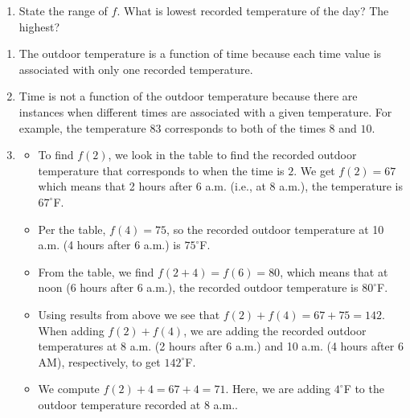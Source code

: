 \documentclass{ximera}
\begin{document}
\begin{example}
\begin{enumerate}
\item  State the range of $f$.  What is lowest recorded temperature of the day?  The highest?  

\end{enumerate}




\begin{explanation}
    
\begin{enumerate}

\item  The outdoor temperature is a function of time because each time value is associated with only one recorded temperature.

\item  Time is not a function of the outdoor temperature because there are instances when different times are associated with a given temperature.  For example, the temperature $83$ corresponds to both of the times $8$ and $10$.

\item 



\begin{itemize}

\item To find $f(2)$, we look in the table to find the recorded outdoor temperature that corresponds to when the time is $2$.  We get $f(2) =  67$ which means that 2 hours after 6 a.m. (i.e., at 8 a.m.), the temperature is $67^{\circ}$F.

\item   Per the table, $f(4) = 75$, so the recorded outdoor temperature at 10 a.m. (4 hours after 6 a.m.) is $75^{\circ}$F.

\item   From the table, we find $f(2+4) = f(6) = 80$, which means that at noon (6 hours after 6 a.m.), the recorded outdoor temperature is $80^{\circ}$F.  

\item  Using results from above we see that  $f(2) + f(4) =  67 + 75 = 142$.  When adding $f(2) + f(4)$, we are adding the recorded outdoor temperatures at 8 a.m. (2 hours after 6 a.m.) and 10 a.m. (4 hours after 6 AM), respectively,  to get $142^{\circ}$F.  

\item We compute $f(2) + 4 = 67 + 4 = 71$.  Here, we are adding $4^{\circ}$F to the outdoor temperature recorded at 8 a.m..


\end{itemize}
\end{enumerate}
\end{explanation}
\end{example}
\end{document}
